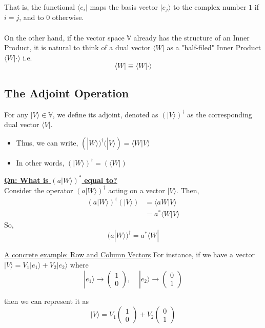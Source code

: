 \documentclass[twoside]{article}
\newcommand{\ket}[1]{|#1 \rangle}
\newcommand{\bra}[1]{\langle #1|}
\newcommand{\inner}[2]{\langle #1 | #2 \rangle}
\newcommand{\V}{\mathbb{V}}
\begin{document}
That is, the functional $\bra{e_i}$ maps the basis vector $\ket{e_j}$ to the complex number $1$ if $i = j$, and to $0$ otherwise.
\\
\\
On the other hand, if the vector space $\V$ already has the structure of an Inner Product, it is natural to think of a dual vector $\bra{W}$ as a "half-filed" Inner Product $\inner{W}{\cdot}$ i.e.
\[ \bra{W} \equiv \inner{W}{\cdot} \]

\subsection*{The Adjoint Operation}
For any $\ket{V} \in \V$, we define its adjoint, denoted as $(\ket{V})^{\dagger}$ as the corresponding dual vector $\bra{V}$. 
\begin{itemize}
   \item Thus, we can write, $(\ket{W})^{\dagger} (\ket{V}) = \inner{W}{V}$
   \item In other words, $(\ket{W})^{\dagger} = (\bra{W})$
\end{itemize}
\underline{\textbf{Qn: What is} $(a \ket{W})^{*}$ \textbf{equal to?}}
\\
Consider the operator $(a\ket{W})^{\dagger}$ acting on a vector $\ket{V}$. Then,
\begin{align*}
   (a\ket{W})^{\dagger} (\ket{V}) &= \inner{aW}{V} \\
                                  &= a^{*}\inner{W}{V}
\end{align*}
So, \[ \boxed{(a\ket{W})^{\dagger}  = a^{*} \bra{W}} \]

\underline{A concrete example: Row and Column Vectors}
For instance, if we have a vector $\ket{V} = V_1 \ket{e_1} + V_2 \ket{e_2}$ where 
\[ \ket{e_1} \rightarrow \begin{pmatrix} 1 \\ 0 \end{pmatrix},\;\;\;\; \ket{e_2} \rightarrow \begin{pmatrix} 0 \\ 1 \end{pmatrix} \]

then we can represent it as 
\[ \ket{V} = V_1\begin{pmatrix} 1 \\ 0 \end{pmatrix} + V_2 \begin{pmatrix} 0 \\ 1 \end{pmatrix}   \]
\end{document}
